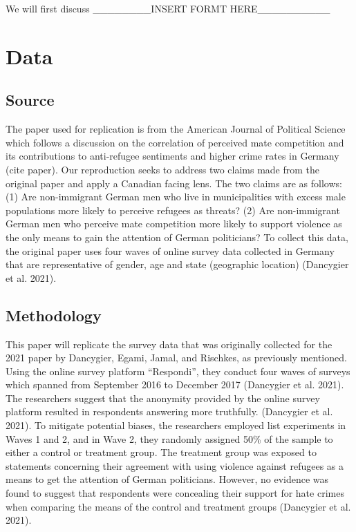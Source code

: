 \documentclass[
]{article}
\begin{document}
We will first discuss \_\_\_\_\_\_\_\_INSERT FORMT
HERE\_\_\_\_\_\_\_\_\_\_

\hypertarget{data}{%
\section{Data}\label{data}}

\hypertarget{source}{%
\subsection{Source}\label{source}}

The paper used for replication is from the American Journal of Political
Science which follows a discussion on the correlation of perceived mate
competition and its contributions to anti-refugee sentiments and higher
crime rates in Germany (cite paper). Our reproduction seeks to address
two claims made from the original paper and apply a Canadian facing
lens. The two claims are as follows: (1) Are non-immigrant German men
who live in municipalities with excess male populations more likely to
perceive refugees as threats? (2) Are non-immigrant German men who
perceive mate competition more likely to support violence as the only
means to gain the attention of German politicians? To collect this data,
the original paper uses four waves of online survey data collected in
Germany that are representative of gender, age and state (geographic
location) (Dancygier et al. 2021).

\hypertarget{methodology}{%
\subsection{Methodology}\label{methodology}}

This paper will replicate the survey data that was originally collected
for the 2021 paper by Dancygier, Egami, Jamal, and Rischkes, as
previously mentioned. Using the online survey platform ``Respondi'',
they conduct four waves of surveys which spanned from September 2016 to
December 2017 (Dancygier et al. 2021). The researchers suggest that the
anonymity provided by the online survey platform resulted in respondents
answering more truthfully. (Dancygier et al. 2021). To mitigate
potential biases, the researchers employed list experiments in Waves 1
and 2, and in Wave 2, they randomly assigned 50\% of the sample to
either a control or treatment group. The treatment group was exposed to
statements concerning their agreement with using violence against
refugees as a means to get the attention of German politicians. However,
no evidence was found to suggest that respondents were concealing their
support for hate crimes when comparing the means of the control and
treatment groups (Dancygier et al. 2021).
\end{document}
